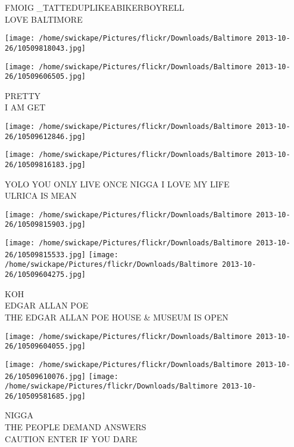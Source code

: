 \documentclass[10pt,letterpaper]{article}
\begin{document}
FMOIG \_TATTEDUPLIKEABIKERBOYRELL\\
LOVE BALTIMORE\\
\pagebreak

\texttt{[image: /home/swickape/Pictures/flickr/Downloads/Baltimore 2013-10-26/10509818043.jpg]}

\vspace{0.25in}
\texttt{[image: /home/swickape/Pictures/flickr/Downloads/Baltimore 2013-10-26/10509606505.jpg]}

PRETTY\\
I AM GET\\
\pagebreak

\texttt{[image: /home/swickape/Pictures/flickr/Downloads/Baltimore 2013-10-26/10509612846.jpg]}

\vspace{0.25in}
\texttt{[image: /home/swickape/Pictures/flickr/Downloads/Baltimore 2013-10-26/10509816183.jpg]}

YOLO YOU ONLY LIVE ONCE NIGGA I LOVE MY LIFE\\
ULRICA IS MEAN\\
\pagebreak

\texttt{[image: /home/swickape/Pictures/flickr/Downloads/Baltimore 2013-10-26/10509815903.jpg]}

\vspace{0.25in}
\texttt{[image: /home/swickape/Pictures/flickr/Downloads/Baltimore 2013-10-26/10509815533.jpg]}
\texttt{[image: /home/swickape/Pictures/flickr/Downloads/Baltimore 2013-10-26/10509604275.jpg]}

KOH\\
EDGAR ALLAN POE\\
THE EDGAR ALLAN POE HOUSE \& MUSEUM IS OPEN\\
\pagebreak

\texttt{[image: /home/swickape/Pictures/flickr/Downloads/Baltimore 2013-10-26/10509604055.jpg]}

\vspace{0.25in}
\texttt{[image: /home/swickape/Pictures/flickr/Downloads/Baltimore 2013-10-26/10509610076.jpg]}
\texttt{[image: /home/swickape/Pictures/flickr/Downloads/Baltimore 2013-10-26/10509581685.jpg]}

NIGGA\\
THE PEOPLE DEMAND ANSWERS\\
CAUTION ENTER IF YOU DARE\\
\pagebreak
\end{document}
